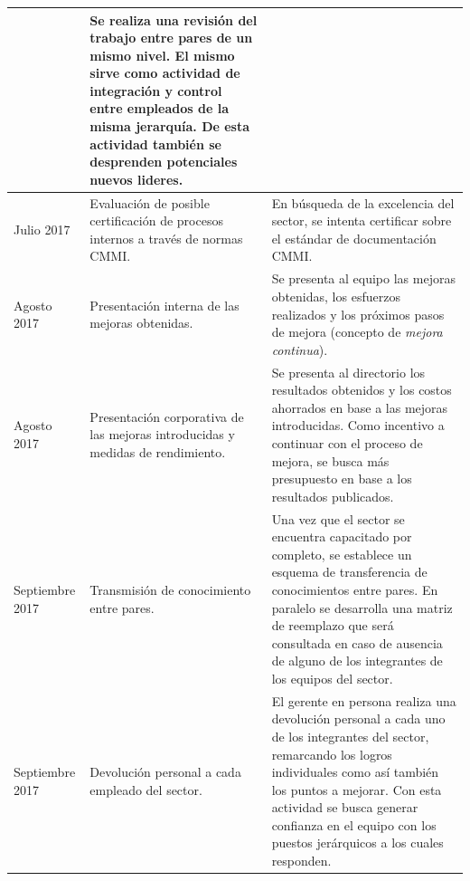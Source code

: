 \begin{center}
\begin{longtable}{|>{\centering\arraybackslash}m{3cm}|>{\centering\arraybackslash}m{3cm}|m{7cm}|}
&
Se realiza una revisión del trabajo entre pares de un mismo nivel. El mismo sirve como actividad de integración y control entre empleados de la misma jerarquía.
De esta actividad también se desprenden potenciales nuevos lideres.
\\
\hline
Julio 2017
&
Evaluación de posible certificación de procesos internos a través de normas CMMI.
&
En búsqueda de la excelencia del sector, se intenta certificar sobre el estándar de documentación CMMI.
\\
\hline
Agosto 2017
&
Presentación interna de las mejoras obtenidas.
&
Se presenta al equipo las mejoras obtenidas, los esfuerzos realizados y los próximos pasos de mejora (concepto de \textit{mejora continua}).
\\
\hline
Agosto 2017
&
Presentación corporativa de las mejoras introducidas y medidas de rendimiento.
&
Se presenta al directorio los resultados obtenidos y los costos ahorrados en base a las mejoras introducidas. Como incentivo a continuar con el proceso de mejora, se busca más presupuesto en base a los resultados publicados.
\\
\hline
Septiembre 2017
&
Transmisión de conocimiento entre pares.
&
Una vez que el sector se encuentra capacitado por completo, se establece un esquema de transferencia de conocimientos entre pares. En paralelo se desarrolla una matriz de reemplazo que será consultada en caso de ausencia de alguno de los integrantes de los equipos del sector.
\\
\hline
Septiembre 2017
&
Devolución personal a cada empleado del sector.
&
El gerente en persona realiza una devolución personal a cada uno de los integrantes del sector, remarcando los logros individuales como así también los puntos a mejorar. Con esta actividad se busca generar confianza en el equipo con los puestos jerárquicos a los cuales responden.
\\
\hline

\end{longtable}
\end{center}
